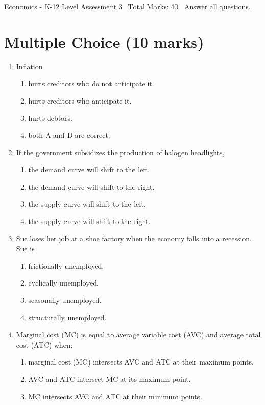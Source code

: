 \documentclass[12pt]{article}
\begin{document}
\begin{center}
Economics - K-12 Level Assessment 3 \
Total Marks: 40 \
Answer all questions.
\end{center}

\section*{Multiple Choice (10 marks)}
\begin{enumerate}[label=\arabic*.]
\item Inflation
\begin{enumerate}[label=(\alph*)]
    \item hurts creditors who do not anticipate it.
    \item hurts creditors who anticipate it.
    \item hurts debtors.
    \item both A and D are correct.
\end{enumerate}
\item If the government subsidizes the production of halogen headlights,
\begin{enumerate}[label=(\alph*)]
    \item the demand curve will shift to the left.
    \item the demand curve will shift to the right.
    \item the supply curve will shift to the left.
    \item the supply curve will shift to the right.
\end{enumerate}
\item Sue loses her job at a shoe factory when the economy falls into a recession. Sue is
\begin{enumerate}[label=(\alph*)]
    \item frictionally unemployed.
    \item cyclically unemployed.
    \item seasonally unemployed.
    \item structurally unemployed.
\end{enumerate}
\item Marginal cost (MC) is equal to average variable cost (AVC) and average total cost (ATC) when:
\begin{enumerate}[label=(\alph*)]
    \item marginal cost (MC) intersects AVC and ATC at their maximum points.
    \item AVC and ATC intersect MC at its maximum point.
    \item MC intersects AVC and ATC at their minimum points.

\end{enumerate}
\end{enumerate}
\end{document}
